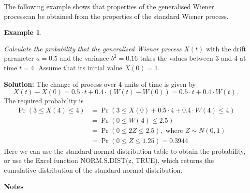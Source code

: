 \documentclass[
]{book}
\theoremstyle{definition}
\theoremstyle{definition}
\newtheorem{example}{Example}[chapter]
\theoremstyle{definition}
\theoremstyle{definition}
\theoremstyle{remark}
\begin{document}
The following example shows that properties of the generalised Wiener
processcan be obtained from the properties of the standard Wiener
process.

\begin{example}
\protect\hypertarget{exm:unlabeled-div-76}{}\label{exm:unlabeled-div-76}

\emph{Calculate the probability that the generalised Wiener process} \(X(t)\)
with the drift parameter \(a = 0.5\) and the variance \(b^2 = 0.16\) takes
the values between 3 and 4 at time \(t = 4\). Assume that its initial
value \(X(0) = 1\).

\end{example}

\textbf{Solution:} The change of process over 4 units of time is given by
\[X(t) - X(0) = 0.5 \cdot t + 0.4 \cdot (W(t) - W(0)) = 0.5 \cdot t + 0.4 \cdot W(t) .\]
The required probability is \[\begin{aligned}
        \Pr(3 \le X(4) \le 4) &= \Pr( 3 \le  X(0) + 0.5 \cdot 4 + 0.4 \cdot W(4)   \le 4  )\\
            &= \Pr(0 \le W(4) \le 2.5) \\
            &= \Pr(0 \le 2 Z \le 2.5), \text{ where }  Z \sim N(0,1) \\
            &= \Pr(0 \le Z \le 1.25) = 0.3944
    \end{aligned}\] Here we can use the standard normal distribution
table to obtain the probability, or use the Excel function
NORM.S.DIST(z, TRUE), which returns the cumulative distribution of the
standard normal distribution.

\textbf{Notes}
\end{document}

